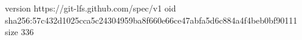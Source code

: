 version https://git-lfs.github.com/spec/v1
oid sha256:57c432d1025cca5c24304959ba8f660e66ce47abfa5d6c884a4f4beb0bf90111
size 336
